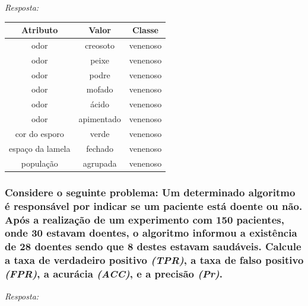 \documentclass{article}
\begin{document}
\textit{Resposta:} 
\begin{table}[H]
  \centering
  \begin{tabular}{|c|c|c|}
    \hline
    \rowcolor[HTML]{C0C0C0} 
    \textbf{Atributo} & \textbf{Valor} & \textbf{Classe} \\ \hline
    odor              & creosoto       & venenoso        \\ \hline
    odor              & peixe          & venenoso        \\ \hline
    odor              & podre          & venenoso        \\ \hline
    odor              & mofado         & venenoso        \\ \hline
    odor              & ácido          & venenoso        \\ \hline
    odor              & apimentado     & venenoso        \\ \hline
    cor do esporo     & verde          & venenoso        \\ \hline
    espaço da lamela  & fechado        & venenoso        \\ \hline
    população         & agrupada       & venenoso        \\ \hline
  \end{tabular}
\end{table}

\subsubsection{Considere o seguinte problema: Um determinado algoritmo é responsável por indicar se um paciente está doente ou não. Após a realização de um experimento com 150 pacientes, onde 30 estavam doentes, o algoritmo informou a existência de 28 doentes sendo que 8 destes estavam saudáveis. Calcule a taxa de verdadeiro positivo \textit{(TPR)}, a taxa de falso positivo \textit{(FPR)}, a acurácia  \textit{(ACC)}, e a precisão \textit{(Pr)}.}
\textit{Resposta:} 
\end{document}
